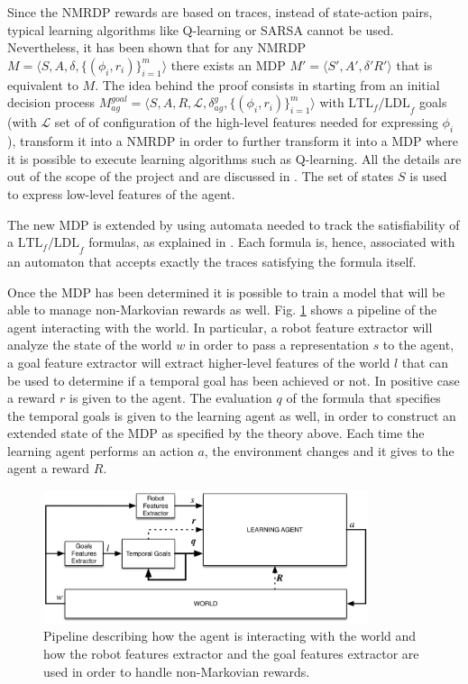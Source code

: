 Since the NMRDP rewards are based on traces, instead of state-action pairs,
typical learning algorithms like Q-learning or SARSA cannot be used.
Nevertheless, it has been shown \cite{DBLP:journals/corr/abs-1807-06333} that
for any NMRDP $M = \langle S, A, \delta, \{ (\phi_i, r_i) \}_{i=1}^m \rangle$
there exists an MDP $M' = \langle S', A', \delta' R' \rangle$ that is equivalent
to $M$. The idea behind the proof consists in starting from an initial
decision process $M_{ag}^{goal} = \langle S, A, R, \mathcal{L},
\delta_{ag}^g, \{ (\phi_i, r_i) \}_{i=1}^m \rangle$ with
$\text{LTL}_f\text{/LDL}_f$ goals (with $\mathcal{L}$ set of of configuration
of the high-level features needed for expressing $\phi_i$),
transform it into a NMRDP in order to
further transform it into a MDP where it is possible to execute learning
algorithms such as Q-learning. All the details are out of the scope of the
project and are discussed in \cite{DBLP:journals/corr/abs-1807-06333}. The
set of states $S$ is used to express low-level features of the agent.

The new MDP is extended by using automata needed to track the satisfiability
of a $\text{LTL}_f\text{/LDL}_f$ formulas, as explained in
\cite{DBLP:conf/aaai/2018}. Each formula is, hence, associated with an
automaton that accepts exactly the traces satisfying the formula itself.

Once the MDP has been determined it is possible to train a model that will
be able to manage non-Markovian rewards as well. Fig.
\ref{fig:rl-temporalgoals-pipeline} shows a pipeline of the
agent interacting with the world. In particular, a robot feature extractor
will analyze the state of the world $w$ in order to pass a representation $s$ to the
agent, a goal feature extractor will extract higher-level features of the world
$l$
that can be used to determine if a temporal goal has been achieved or not. In
positive case a reward $r$ is given to the agent. The evaluation $q$ of the formula
that specifies the temporal goals is given to the learning agent as well, in
order to construct an extended state of the MDP as specified by the theory above.
Each time the learning agent performs an action $a$, the environment changes
and it gives to the agent a reward $R$.
\begin{figure}
    \centering
    \includegraphics[width=0.85\textwidth]{images/rl-temporalgoals-pipeline.png}
    \caption{Pipeline describing how the agent is interacting with the
        world and how the robot features extractor and the goal features
        extractor are used in order to handle non-Markovian rewards.}
    \label{fig:rl-temporalgoals-pipeline}
\end{figure}

